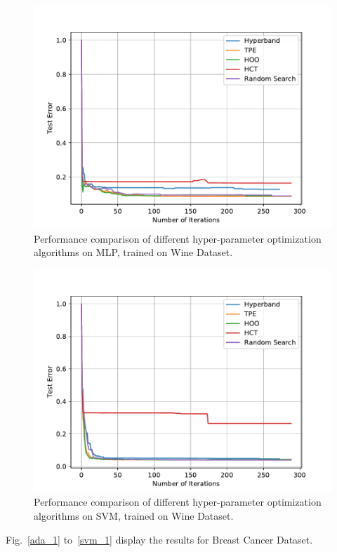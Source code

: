 \documentclass[runningheads,a4paper]{llncs}
\begin{document}
\begin{figure}[ht]
    \centering
    \includegraphics[scale=0.8]{img/uci/sk_mlp_0.pdf}
    \caption{Performance comparison of different hyper-parameter optimization algorithms on MLP, trained on Wine Dataset.}
    \label{sk_mlp_0}
\end{figure}

\begin{figure}[ht]
    \centering
    \includegraphics[scale=0.8]{img/uci/svm_0.pdf}
    \caption{Performance comparison of different hyper-parameter optimization algorithms on SVM, trained on Wine Dataset.}
    \label{svm_0}
\end{figure}

Fig.~\ref{ada_1} to~\ref{svm_1} display the results for Breast Cancer Dataset.
\end{document}
